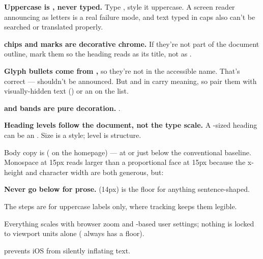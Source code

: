 \documentclass[fontpath=fonts/,logopath=logo/]{riposte-doc}
\begin{document}
\begin{ripbullets}
\item \textbf{Uppercase is , never typed.} Type , style it uppercase. A screen reader announcing  as letters is a real failure mode, and text typed in caps also can't be searched or translated properly.
\item \textbf{ chips and  marks are decorative chrome.} If they're not part of the document outline, mark them  so the heading reads as its title, not as .
\item \textbf{Glyph bullets come from ,} so they're not in the accessible name. That's correct —  shouldn't be announced. But  and  in   carry meaning, so pair them with visually-hidden text () or an  on the list.
\item \textbf{ and  bands are pure decoration.} .
\item \textbf{Heading levels follow the document, not the type scale.} A -sized heading can be an . Size is a style; level is structure.
\end{ripbullets}



Body copy is \ripmono{15px} (\ripmono{16px} on the homepage) — at or just below the conventional \ripmono{16px} baseline. Monospace at 15px reads larger than a proportional face at 15px because the x-height and character width are both generous, but:

\begin{ripbullets}
\item \textbf{Never go below \ripmono{14px} for prose.}  (14px) is the floor for anything sentence-shaped.
\item The  steps are for uppercase labels only, where tracking keeps them legible.
\item Everything scales with browser zoom and -based user settings; nothing is locked to viewport units alone ( always has a  floor).
\item {} prevents iOS from silently inflating text.
\end{ripbullets}
\end{document}
